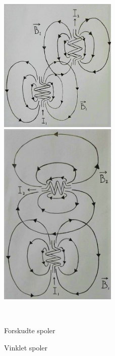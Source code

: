 \begin{figure}[H]
	\centering
	\begin{minipage}[b]{0.48\textwidth}
	\centering
	\includegraphics[width=0.5\textwidth]{Vildledning/Schematics/forskudte_spoler} %
	\end{minipage}
	\hfill
	\begin{minipage}[b]{0.48\textwidth}
	\centering
	\includegraphics[width=0.5\textwidth]{Vildledning/Schematics/vinklet_spoler} %
	\end{minipage}
	\\ %
	\begin{minipage}[t]{0.48\textwidth}
	\caption{Forskudte spoler} %
	\label{fspoler}
	\end{minipage}
	\hfill
	\begin{minipage}[t]{0.48\textwidth}
	\caption{Vinklet spoler} %
	\label{vspoler}
	\end{minipage}
\end{figure}

